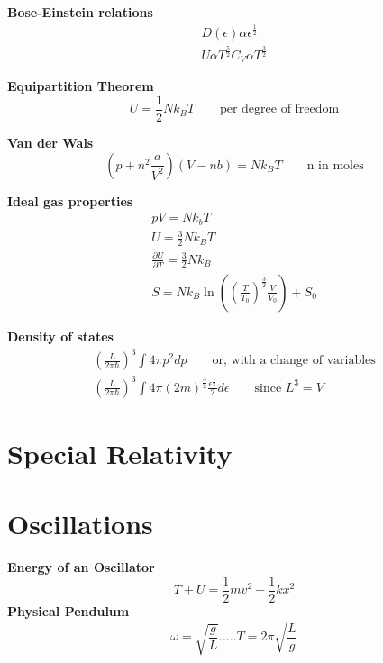 \documentclass{article}
\begin{document}
{\bf Bose-Einstein relations}
\begin{gather}
  D(\epsilon) \alpha \epsilon^{\frac{1}{2}} \\
  U \alpha T^{\frac{5}{2}}
  C_V \alpha T^{\frac{3}{2}}
\end{gather}
  
{\bf Equipartition Theorem}
\begin{equation}
  U = \frac{1}{2}Nk_{B}T \qquad \textrm{per degree of freedom}
\end{equation}

{\bf Van der Wals}
\begin{equation}
  \left(p + n^2\frac{a}{V^2}\right)\left(V-nb\right) = Nk_BT \qquad \textrm{n in moles}
\end{equation}

{\bf Ideal gas properties} %
\begin{gather}
  pV = Nk_bT \\
  U = \frac{3}{2}Nk_BT \\
  \frac{\partial U}{\partial T} = \frac{3}{2}Nk_B \\
  S = Nk_B\ln\left(\left(\frac{T}{T_0}\right)^{\frac{3}{2}}\frac{V}{V_0}\right) + S_0
\end{gather}

{\bf Density of states}
\begin{gather}
  \left(\frac{L}{2\pi\hbar}\right)^3\int 4\pi p^2 dp \qquad \textrm{or, with a change of variables} \\
  \left(\frac{L}{2\pi\hbar}\right)^3\int 4\pi \left(2m\right)^{\frac{3}{2}}\frac{\epsilon^{\frac{1}{2}}}{2} d\epsilon \qquad \textrm{since $L^3 = V$}
\end{gather}




\section{Special Relativity}









\section{Oscillations}
{\bf{Energy of an Oscillator}}\begin{equation}T+U=\frac{1}{2}mv^2 + \frac{1}{2}kx^2\end{equation}
{\bf{Physical Pendulum}}\begin{equation}\omega = \sqrt{\frac{g}{L}}.....T=2\pi \sqrt{\frac{L}{g}}\end{equation}
\end{document}
